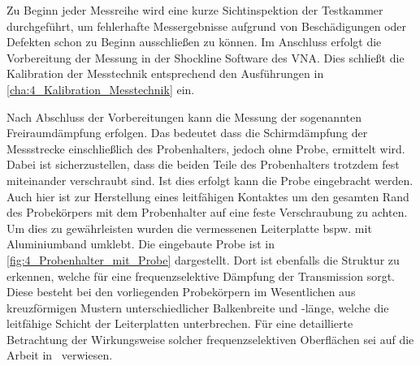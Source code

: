 Zu Beginn jeder Messreihe wird eine kurze Sichtinspektion der Testkammer durchgeführt, um fehlerhafte Messergebnisse aufgrund von Beschädigungen oder Defekten schon zu Beginn ausschließen zu können. Im Anschluss erfolgt die Vorbereitung der Messung in der Shockline Software des VNA. Dies schließt die Kalibration der Messtechnik entsprechend den Ausführungen in \Abschnitt\ref{cha:4_Kalibration_Messtechnik} ein.
\par
\vspace{\linespace}
Nach Abschluss der Vorbereitungen kann die Messung der sogenannten Freiraumdämpfung erfolgen. Das bedeutet dass die Schirmdämpfung der Messstrecke einschließlich des Probenhalters, jedoch ohne Probe, ermittelt wird. Dabei ist sicherzustellen, dass die beiden Teile des Probenhalters trotzdem fest miteinander verschraubt sind. Ist dies erfolgt kann die Probe eingebracht werden. Auch hier ist zur Herstellung eines leitfähigen Kontaktes um den gesamten Rand des Probekörpers mit dem Probenhalter auf eine feste Verschraubung zu achten. Um dies zu gewährleisten wurden die vermessenen Leiterplatte bspw. mit Aluminiumband umklebt. Die eingebaute Probe ist in \Abb\ref{fig:4_Probenhalter_mit_Probe} dargestellt. Dort ist ebenfalls die Struktur zu erkennen, welche für eine frequenzselektive Dämpfung der Transmission sorgt. Diese besteht bei den vorliegenden Probekörpern im Wesentlichen aus kreuzförmigen Mustern unterschiedlicher Balkenbreite und -länge, welche die leitfähige Schicht der Leiterplatten unterbrechen. Für eine detaillierte Betrachtung der Wirkungsweise solcher frequenzselektiven Oberflächen sei auf die Arbeit in~\cite{FSS_Toedter_Diplomarbeit} verwiesen.
\par
\vspace{\linespace}


